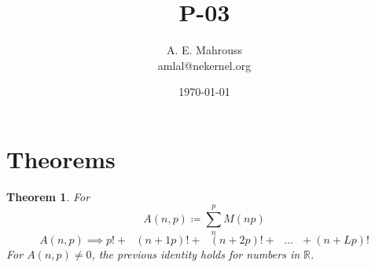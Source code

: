 \documentclass{article}
\title{P-03}
\author{A. E. Mahrouss\\amlal@nekernel.org}
\date{\today}
\theoremstyle{plain}
\newtheorem{theorem}{Theorem}[section]
\theoremstyle{definition}
\theoremstyle{remark}
\begin{document}
\maketitle

\section{Theorems}

\begin{theorem}
For
\begin{equation}
    A(n, p) \coloneq \sum_{n}^{p} M(n p)
\end{equation}
\begin{equation}
    A(n, p) \implies p! + \text{ } (n+1p)! + \text{ } (n+2p)! + \text{ } \dots \text{ } + (n+Lp)! 
\end{equation}
For $A(n, p) \neq 0$, the previous identity holds for numbers in $\mathbb{R}$.
\end{theorem}
\end{document}
